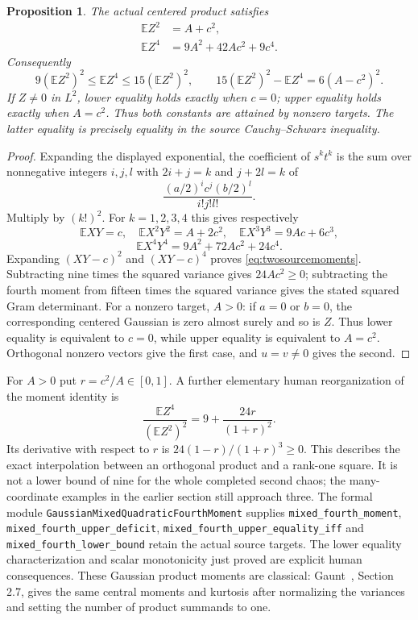 \documentclass[11pt]{article}
\newtheorem{proposition}[theorem]{Proposition}
\newcommand{\E}{\mathbb E}
\begin{document}
\begin{proposition}\label{prop:twosource}
The actual centered product satisfies
\begin{align}\label{eq:twosourcemoments}
 \E Z^2&=A+c^2,\\
 \E Z^4&=9A^2+42Ac^2+9c^4.\nonumber
\end{align}
Consequently
\begin{equation}\label{eq:twosourcebounds}
 9(\E Z^2)^2\leq\E Z^4\leq15(\E Z^2)^2,
 \qquad
 15(\E Z^2)^2-\E Z^4=6(A-c^2)^2.
\end{equation}
If $Z\ne0$ in $L^2$, lower equality holds exactly when $c=0$;
upper equality holds exactly when $A=c^2$. Thus both constants are
attained by nonzero targets. The latter equality is precisely equality
in the source Cauchy--Schwarz inequality.
\end{proposition}
\begin{proof}
Expanding the displayed exponential, the coefficient of $s^kt^k$
is the sum over nonnegative integers $i,j,l$ with $2i+j=k$ and
$j+2l=k$ of
\[
 \frac{(a/2)^i c^j(b/2)^l}{i!j!l!}.
\]
Multiply by $(k!)^2$. For $k=1,2,3,4$ this gives respectively
\[
 \E XY=c,\quad \E X^2Y^2=A+2c^2,\quad
 \E X^3Y^3=9Ac+6c^3,
\]
\[
 \E X^4Y^4=9A^2+72Ac^2+24c^4.
\]
Expanding $(XY-c)^2$ and $(XY-c)^4$ proves
\eqref{eq:twosourcemoments}. Subtracting nine times the squared
variance gives $24Ac^2\geq0$; subtracting the fourth moment from
fifteen times the squared variance gives the stated squared Gram
determinant. For a nonzero target, $A>0$: if $a=0$ or $b=0$,
the corresponding centered Gaussian is zero almost surely and so is
$Z$. Thus lower equality is equivalent to $c=0$, while upper equality
is equivalent to $A=c^2$. Orthogonal nonzero vectors give the first
case, and $u=v\ne0$ gives the second.
\end{proof}

For $A>0$ put $r=c^2/A\in[0,1]$. A further elementary human
reorganization of the moment identity is
\[
 \frac{\E Z^4}{(\E Z^2)^2}
 =9+\frac{24r}{(1+r)^2}.
\]
Its derivative with respect to $r$ is $24(1-r)/(1+r)^3\geq0$.
This describes the exact interpolation between an orthogonal product
and a rank-one square. It is not a lower bound of nine for the whole
completed second chaos; the many-coordinate examples in the earlier
section still approach three. The formal module
\texttt{GaussianMixedQuadraticFourthMoment} supplies
\texttt{mixed\_fourth\_moment},
\texttt{mixed\_fourth\_upper\_deficit},
\texttt{mixed\_fourth\_upper\_equality\_iff} and
\texttt{mixed\_fourth\_lower\_bound} retain the actual source targets.
The lower equality characterization and scalar monotonicity just
proved are explicit human consequences. These Gaussian product
moments are classical: Gaunt~\cite{Gaunt}, Section 2.7, gives the same
central moments and kurtosis after normalizing the variances and
setting the number of product summands to one.
\end{document}
